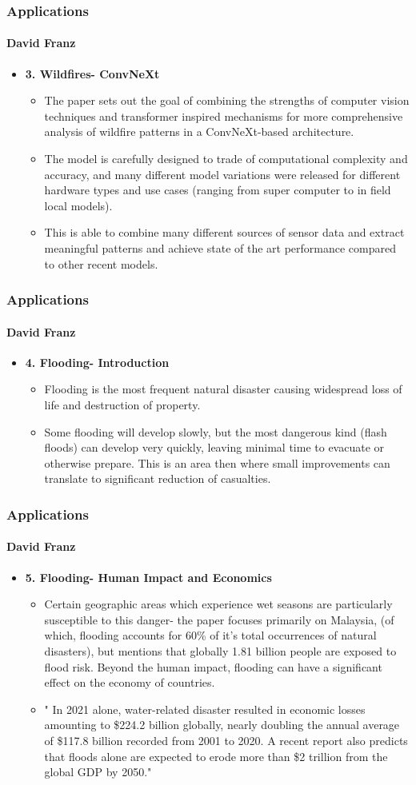 \documentclass{beamer}
\newcommand{\namedframe}[3]{
  \begin{frame}
    \frametitle{#2}
    \framesubtitle{#1}
    #3
  \end{frame}
}
\begin{document}
\namedframe{David Franz}{Applications}{
\begin{itemize}
    \item \textbf{3. Wildfires- ConvNeXt}
    \begin{itemize}
        \item The paper sets out the goal of combining the strengths of computer vision techniques and transformer inspired mechanisms for more comprehensive analysis of wildfire patterns in a ConvNeXt-based architecture. 
        \item The model is carefully designed to trade of computational complexity and accuracy, and many different model variations were released for different hardware types and use cases (ranging from super computer to in field local models).
        \item         This is able to combine many different sources of sensor data and extract meaningful patterns and achieve state of the art performance compared to other recent models.
    \end{itemize}
\end{itemize}
}

\namedframe{David Franz}{Applications}{
\begin{itemize}
    \item \textbf{4. Flooding- Introduction}
    \begin{itemize}
        \item Flooding is the most frequent natural disaster causing widespread loss of life and destruction of property. 
        \item Some flooding will develop slowly, but the most dangerous kind (flash floods) can develop very quickly, leaving minimal time to evacuate or otherwise prepare. This is an area then where small improvements can translate to significant reduction of casualties. 
    \end{itemize}
\end{itemize}
}

\namedframe{David Franz}{Applications}{
\begin{itemize}
    \item \textbf{5. Flooding- Human Impact and Economics}
    \begin{itemize}

        \item Certain geographic areas which experience wet seasons are particularly susceptible to this danger- the paper focuses primarily on Malaysia, (of which, flooding accounts for 60\% of it's total occurrences of natural disasters), but mentions that globally 1.81 billion people are exposed to flood risk. Beyond the human impact, flooding can have a significant effect on the economy of countries.
        \item " In 2021 alone, water-related disaster resulted in economic losses amounting to \$224.2 billion  globally, nearly doubling the annual average of \$117.8 billion recorded from 2001 to 2020. A recent report also predicts that floods alone are expected to erode more than \$2 trillion from the global GDP by 2050."

    \end{itemize}
\end{itemize}
}
\end{document}
